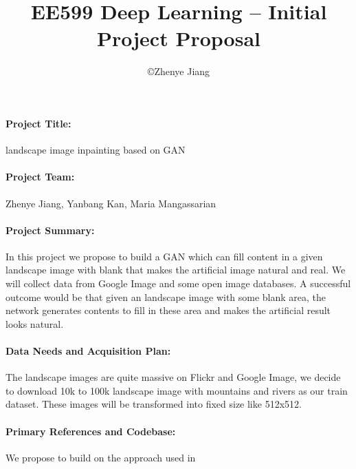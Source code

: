 \documentclass[11pt]{article}
\title{\bf EE599 Deep Learning -- Initial Project Proposal}
\author{\copyright  Zhenye Jiang}
\begin{document}
\maketitle

\paragraph{Project Title:}  landscape image inpainting based on GAN

\paragraph{Project Team:} Zhenye Jiang, Yanbang Kan, Maria Mangassarian

\paragraph{Project Summary:}   In this project we propose to build a GAN which can fill content in a given landscape image with blank that makes the artificial image natural and real. We will collect data from Google Image and some open image databases. A successful outcome would be that given an landscape image with some blank area, the network generates contents to fill in these area and makes the artificial result looks natural. 

\paragraph{Data Needs and Acquisition Plan:}  The landscape images are quite massive on Flickr and Google Image, we decide to download 10k to 100k landscape image with mountains and rivers as our train dataset. These images will be transformed into fixed size like 512x512.


\paragraph{Primary References and Codebase:}  We propose to build on the approach used in 
\end{document}
